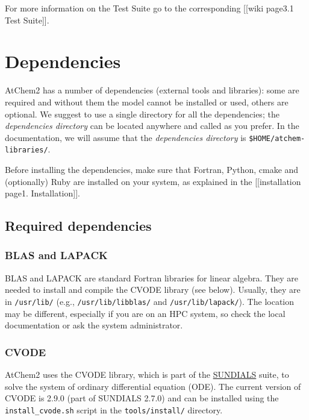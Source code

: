For more information on the Test Suite go to the corresponding
{[}{[}wiki page\textbar{}3.1 Test Suite{]}{]}.

\section{Dependencies} \label{sec:dependencies}

AtChem2 has a number of dependencies (external tools and libraries):
some are required and without them the model cannot be installed or
used, others are optional. We suggest to use a single directory for all
the dependencies; the \emph{dependencies directory} can be located
anywhere and called as you prefer. In the documentation, we will assume
that the \emph{dependencies directory} is
\texttt{\$HOME/atchem-libraries/}.

Before installing the dependencies, make sure that Fortran, Python,
cmake and (optionally) Ruby are installed on your system, as explained
in the {[}{[}installation page\textbar{}1. Installation{]}{]}.

\subsection{Required dependencies} \label{subsec:required-dependencies}

\subsubsection{BLAS and LAPACK} \label{blas-and-lapack}

BLAS and LAPACK are standard Fortran libraries for linear algebra. They
are needed to install and compile the CVODE library (see below).
Usually, they are in \texttt{/usr/lib/} (e.g.,
\texttt{/usr/lib/libblas/} and \texttt{/usr/lib/lapack/}). The location
may be different, especially if you are on an HPC system, so check the
local documentation or ask the system administrator.

\subsubsection{CVODE} \label{cvode}

AtChem2 uses the CVODE library, which is part of the
\href{https://computation.llnl.gov/projects/sundials}{SUNDIALS} suite,
to solve the system of ordinary differential equation (ODE). The current
version of CVODE is 2.9.0 (part of SUNDIALS 2.7.0) and can be installed
using the \texttt{install\_cvode.sh} script in the
\texttt{tools/install/} directory.


